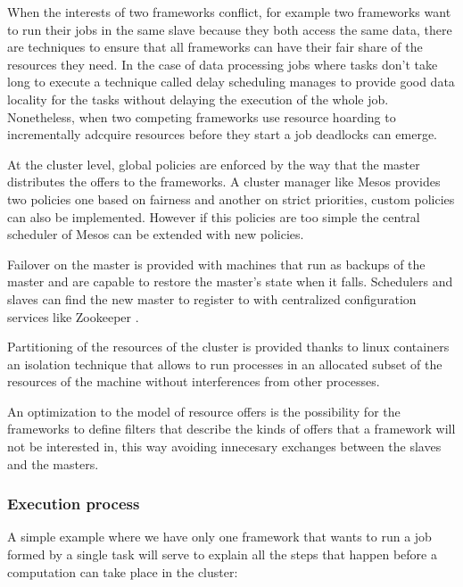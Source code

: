 \documentclass{svjour3}                     %
\begin{document}
When the interests of two frameworks conflict, for example two
frameworks want to run their jobs in the same slave because they both
access the same data, there are techniques to ensure that all
frameworks can have their fair share of the resources they need. In
the case of data processing jobs where tasks don't take long to
execute a technique called delay scheduling \cite{zaharia_delay_2010}
manages to provide good data locality for the tasks without delaying
the execution of the whole job. Nonetheless, when two competing
frameworks use resource hoarding to incrementally adcquire resources
before they start a job deadlocks can emerge.

At the cluster level, global policies are enforced by the way that the
master distributes the offers to the frameworks. A cluster manager
like Mesos \cite{Hindman10mesos:a} provides two policies one based on
fairness \cite{AjtaiANRSW1998} and another on strict priorities,
custom policies can also be implemented. However if this policies are
too simple the central scheduler of Mesos can be extended with new
policies.

Failover on the master is provided with machines that run as backups of the master and
are capable to restore the master's state when it falls. Schedulers and slaves can find
the new master to register to with centralized configuration services like Zookeeper \cite{_apache_????}.

Partitioning of the resources of the cluster is provided thanks to linux containers \cite{_linux_????}
an isolation technique that allows to run processes in an allocated subset of the 
resources of the machine without interferences from other processes. 

An optimization to the model of resource offers is the possibility for the frameworks
to define filters that describe the kinds of offers that a framework will not be interested
in, this way avoiding innecesary exchanges between the slaves and the masters.

\subsubsection{Execution process}

A simple example where we have only one framework that wants to run a 
job formed by a single task will serve to explain all the steps that happen
before a computation can take place in the cluster:
\end{document}
